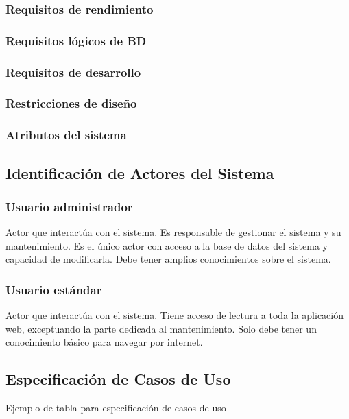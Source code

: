 \begin{myEnumerate}
\item
\end{myEnumerate}


\subsubsection{Requisitos de rendimiento}
\subsubsection{Requisitos lógicos de BD}
\subsubsection{Requisitos de desarrollo}
\subsubsection{Restricciones de diseño}
\subsubsection{Atributos del sistema}


\subsection{Identificación de Actores del Sistema} 
\subsubsection{Usuario administrador}
Actor que interactúa con el sistema. Es responsable de gestionar el sistema y su mantenimiento. Es el único actor con acceso a la base de datos del sistema y capacidad de modificarla. Debe tener amplios conocimientos sobre el sistema.
\subsubsection{Usuario estándar}
Actor que interactúa con el sistema. Tiene acceso de lectura a toda la aplicación web, exceptuando la parte dedicada al mantenimiento. Solo debe tener un conocimiento básico para navegar por internet.

\subsection{Especificación de Casos de Uso}

\textcolor[rgb]{0.65,0.16,0}{Ejemplo de tabla para especificación de casos de uso}

